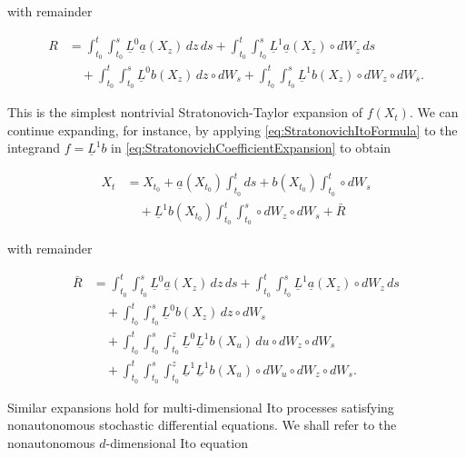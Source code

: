 \noindent with remainder

\begin{equation} \label{eq:StratonovichRemainderFirst}
\begin{split}
    R &= \int_{t_0}^t \int_{t_0}^s \underline{L}^0 \underline{a}(X_z) \, dz \, ds + \int_{t_0}^t \int_{t_0}^s \underline{L}^1 \underline{a}(X_z) \circ dW_z \, ds \\
    &\quad + \int_{t_0}^t \int_{t_0}^s \underline{L}^0 b(X_z) \, dz \circ dW_s + \int_{t_0}^t \int_{t_0}^s \underline{L}^1 b(X_z) \circ dW_z \circ dW_s.
\end{split}
\end{equation}

\noindent This is the simplest nontrivial Stratonovich-Taylor expansion of $f(X_t)$. We can continue expanding, for instance, by applying \eqref{eq:StratonovichItoFormula} to the integrand $f = \underline{L}^1 b$ in \eqref{eq:StratonovichCoefficientExpansion} to obtain

\begin{equation} \label{eq:StratonovichNextExpansion}
\begin{split}
    X_t &= X_{t_0} + \underline{a}(X_{t_0}) \int_{t_0}^t ds + b(X_{t_0}) \int_{t_0}^t \circ dW_s \\
    &\quad + \underline{L}^1 b(X_{t_0}) \int_{t_0}^t \int_{t_0}^s \circ dW_z \circ dW_s + \bar{R}
\end{split}
\end{equation}

\noindent with remainder

\begin{equation} \label{eq:StratonovichRemainderSecond}
\begin{split}
    \bar{R} &= \int_{t_0}^t \int_{t_0}^s \underline{L}^0 \underline{a}(X_z) \, dz \, ds + \int_{t_0}^t \int_{t_0}^s \underline{L}^1 \underline{a}(X_z) \circ dW_z \, ds \\
    &\quad + \int_{t_0}^t \int_{t_0}^s \underline{L}^0 b(X_z) \, dz \circ dW_s \\
    &\quad + \int_{t_0}^t \int_{t_0}^s \int_{t_0}^z \underline{L}^0 \underline{L}^1 b(X_u) \, du \circ dW_z \circ dW_s \\
    &\quad + \int_{t_0}^t \int_{t_0}^s \int_{t_0}^z \underline{L}^1 \underline{L}^1 b(X_u) \circ dW_u \circ dW_z \circ dW_s.
\end{split}
\end{equation}

\noindent Similar expansions hold for multi-dimensional Ito processes satisfying nonautonomous stochastic differential equations. We shall refer to the nonautonomous $d$-dimensional Ito equation

